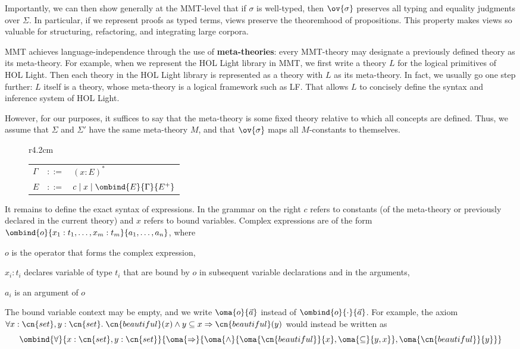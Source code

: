 Importantly, we can then show generally at the MMT-level that if $\sigma$ is well-typed, then $\ov{\sigma}$ preserves all typing and equality judgments over $\Sigma$.
In particular, if we represent proofs as typed terms, views preserve the theoremhood of propositions.
This property makes views so valuable for structuring, refactoring, and integrating large corpora.

MMT achieves language-independence through the use of \textbf{meta-theories}: every MMT-theory may designate a previously defined theory as its meta-theory.
For example, when we represent the HOL Light library in MMT, we first write a theory $L$ for the logical primitives of HOL Light.
Then each theory in the HOL Light library is represented as a theory with $L$ as its meta-theory.
In fact, we usually go one step further: $L$ itself is a theory, whose meta-theory is a logical framework such as LF.
That allows $L$ to concisely define the syntax and inference system of HOL Light.

However, for our purposes, it suffices to say that the meta-theory is some fixed theory relative to which all concepts are defined.
Thus, we assume that $\Sigma$ and $\Sigma'$ have the same meta-theory $M$, and that $\ov{\sigma}$ maps all $M$-constants to themselves.


\begin{figure}r{4.2cm}\vspace*{-2em}
\begin{tabular}{l@{\quad}c@{\quad}l}
 $\Gamma$	& $::=$	& $(x:E)^\ast$ \\
 $E$      & $::=$ & $c \mid x \mid \ombind{E}{\Gamma}{E^+}$ \\
\end{tabular}\vspace*{-2em}
\end{figure}
It remains to define the exact syntax of expressions.   
In the grammar on the right $c$ refers to constants (of the meta-theory or previously declared in the current theory) and $x$ refers to bound variables.
Complex expressions are of the form $\ombind{o}{x_1:t_1,\ldots,x_m:t_m}{a_1,\ldots,a_n}$, where
\begin{compactitem}
 \item $o$ is the operator that forms the complex expression,
 \item $x_i:t_i$ declares variable of type $t_i$ that are bound by $o$ in subsequent variable declarations and in the arguments,
 \item $a_i$ is an argument of $o$
\end{compactitem}
The bound variable context may be empty, and we write $\oma{o}{\vec{a}}$ instead of $\ombind{o}{\cdot}{\vec{a}}$.
For example, the axiom $\forall x:\cn{set},y:\cn{set}.\; \cn{beautiful}(x) \wedge y
\subseteq x \Rightarrow \cn{beautiful}(y)$ would instead be written as \[\ombind{\forall}{x:\cn{set},y:\cn{set}}{\oma{\Rightarrow}{\oma{\wedge}{\oma{\cn{beautiful}}{x},\oma{\subseteq}{y,x}},\oma{\cn{beautiful}}{y}}}\]

